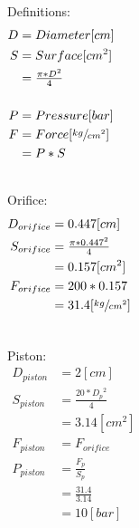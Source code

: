 \documentclass[aspectratio=1610,english,12pt]{beamer}
\begin{document}
\begin{frame}{\insertsubsection}
	\begin{columns}[onlytextwidth]
			Definitions:
			\begin{align*}
				D &= Diameter [cm] \\
				S &= Surface [cm^2] \\
				  &= \tfrac{\pi*D^2}{4} \\
				\\
				P &= Pressure [bar] \\
				F &= Force [\sfrac{kg}{cm^2}]\\
				  &= P*S \\		
			\end{align*}
	\end{columns}
\end{frame}

\begin{frame}{\insertsubsection}
	\begin{columns}[onlytextwidth]
			Orifice:
			\begin{align*}
				D_{orifice} &= 0.447[cm] \\
				S_{orifice} &= \tfrac{\pi*0.447^2}{4}\\
				  &= 0.157[cm^2] \\
				F_{orifice} &= 200*0.157\\
				  &= 31.4 [\sfrac{kg}{cm^2}]
			\end{align*}
	\end{columns}
\end{frame}

\begin{frame}{\insertsubsection}
	\begin{columns}[onlytextwidth]
			Piston:
			\begin{align*}
				D_{piston} &= 2[cm] \\
				S_{piston} &= \tfrac{20*{D_{p}}^2}{4}\\
				  &= 3.14[cm^2] \\
				F_{piston} &= F_{orifice}\\
				P_{piston} &= \tfrac{F_p}{S_p}\\
				  &= \tfrac{31.4}{3.14}\\
				  &= 10 [bar]
			\end{align*}
	\end{columns}
\end{frame}
\end{document}
